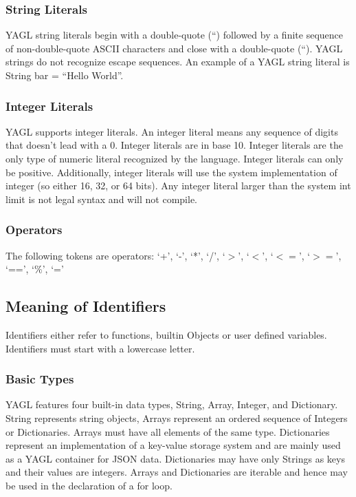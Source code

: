 \documentclass[12pt]{article}
\begin{document}
\subsubsection{String Literals}
YAGL string literals begin with a double-quote (“) followed by a finite sequence of non-double-quote ASCII characters and close with a double-quote (“). YAGL strings do not recognize escape sequences. An example of a YAGL string literal is String bar = “Hello World”.

\subsubsection{Integer Literals}
YAGL supports integer literals.  An integer literal means any sequence of digits that doesn’t lead with a 0.  Integer literals are in base 10.  Integer literals are the only type of numeric literal recognized by the language.  Integer literals can only be positive.  Additionally, integer literals will use the system implementation of integer (so either 16, 32, or 64 bits).  Any integer literal larger than the system int limit is not legal syntax and will not compile.

\subsubsection{Operators}
The following tokens are operators:
‘+’, ‘-’, ‘*’, ‘/’, ‘$>$’, ‘$<$’, ‘$<=$’, ‘$>=$’, ‘==’, ‘$\%$’, ‘=’

\subsection{Meaning of Identifiers}
Identifiers either refer to functions, builtin Objects or user defined variables.  Identifiers must start with a lowercase letter.

\subsubsection{Basic Types}
YAGL features four built-in data types, String, Array, Integer, and Dictionary. String represents string objects, Arrays represent an ordered sequence of Integers or Dictionaries. Arrays must have all elements of the same type.  Dictionaries represent an implementation of a key-value storage system and are mainly used as a YAGL container for JSON data. Dictionaries may have only Strings as keys and their values are integers. Arrays and Dictionaries are iterable and hence may be used in the declaration of a for loop. 
\end{document}
